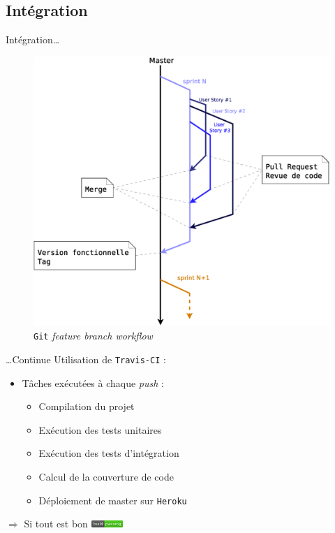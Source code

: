 \AntoineSpeak
\subsection{Intégration}
\begin{frame}{Intégration\ldots}
\begin{figure}
	\centering
	\includegraphics[width=0.83\linewidth]{images/Process/BranchingWorkflow}
	\caption{\texttt{Git} \textit{feature branch workflow}}
	\label{fig:BranchingWorkflow}
\end{figure}
\end{frame}
\begin{frame}{\ldots Continue}	
	\vfill
	Utilisation de \texttt{Travis-CI} : 
\begin{itemize}
	\item Tâches exécutées à chaque \textit{push} :
		\begin{itemize}
			\item Compilation du projet
			\item Exécution des tests unitaires
			\item Exécution des tests d'intégration
			\item Calcul de la couverture de code
			\item Déploiement de master sur \texttt{Heroku}
		\end{itemize}
\end{itemize}
\vfill
\centering
$\Longrightarrow$ Si tout est bon \includegraphics[width=1.2cm]{images/build}
\end{frame}
\ZacSpeak
